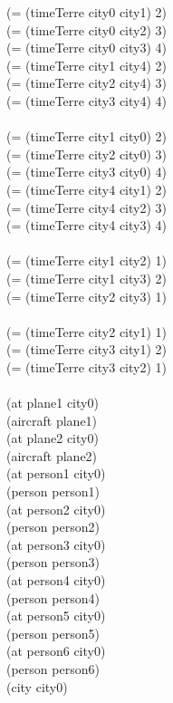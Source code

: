 \documentclass[a4paper,10pt]{article}
\begin{document}
        (= (timeTerre city0 city1) 2)\\
        (= (timeTerre city0 city2) 3)\\
        (= (timeTerre city0 city3) 4)\\
        (= (timeTerre city1 city4) 2)\\
        (= (timeTerre city2 city4) 3)\\
        (= (timeTerre city3 city4) 4)\\
\\
        (= (timeTerre city1 city0) 2)\\
        (= (timeTerre city2 city0) 3)\\
        (= (timeTerre city3 city0) 4)\\
        (= (timeTerre city4 city1) 2)\\
        (= (timeTerre city4 city2) 3)\\
        (= (timeTerre city4 city3) 4)\\
\\
        (= (timeTerre city1 city2) 1)\\
        (= (timeTerre city1 city3) 2)\\
        (= (timeTerre city2 city3) 1)\\
\\
        (= (timeTerre city2 city1) 1)\\
        (= (timeTerre city3 city1) 2)\\
        (= (timeTerre city3 city2) 1)\\
\\
	(at plane1 city0)\\
	(aircraft plane1)\\
	(at plane2 city0)\\
	(aircraft plane2)\\
	(at person1 city0)\\
	(person person1)\\
	(at person2 city0)\\
	(person person2)\\
	(at person3 city0)\\
	(person person3)\\
	(at person4 city0)\\
	(person person4)\\
	(at person5 city0)\\
	(person person5)\\
	(at person6 city0)\\
	(person person6)\\
	(city city0)\\
\end{document}
